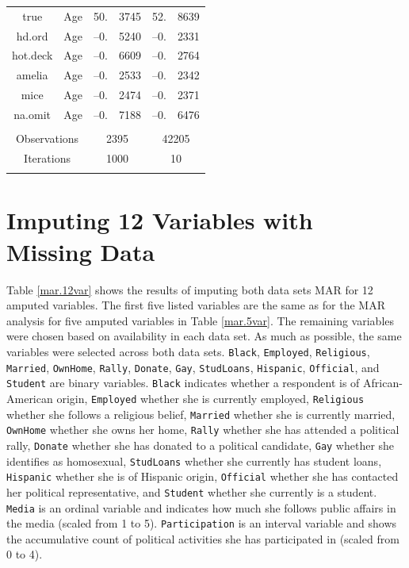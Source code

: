 \documentclass[12pt,econ]{sources/authesis}
\begin{document}
\begin{table}[!htbp]
\begin{tabular}{ccr@{}lr@{}l}
 true & Age & 50.&3745 & 52.&8639 \\ 
 hd.ord & Age & --0.&5240 & --0.&2331 \\
 hot.deck & Age & --0.&6609 & --0.&2764 \\
 amelia & Age & --0.&2533 & --0.&2342 \\
 mice & Age & --0.&2474 & --0.&2371 \\
 na.omit & Age & --0.&7188 & --0.&6476 \\
\hline \\[-1.8ex] 
\multicolumn{2}{c}{Observations} & \multicolumn{2}{c}{2395} & \multicolumn{2}{c}{42205} \\ 
\multicolumn{2}{c}{Iterations} & \multicolumn{2}{c}{1000} & \multicolumn{2}{c}{10} \\ 
\hline \\[-1.8ex] 
\end{tabular} 
\end{table}
\clearpage

\hypertarget{app-ordmiss-12var}{%
\section{Imputing 12 Variables with Missing Data}\label{app-ordmiss-12var}}

Table \ref{mar.12var} shows the results of imputing both data sets MAR for 12 amputed variables. The first five listed variables are the same as for the MAR analysis for five amputed variables in Table \ref{mar.5var}. The remaining variables were chosen based on availability in each data set. As much as possible, the same variables were selected across both data sets. \texttt{Black}, \texttt{Employed}, \texttt{Religious}, \texttt{Married}, \texttt{OwnHome}, \texttt{Rally}, \texttt{Donate}, \texttt{Gay}, \texttt{StudLoans}, \texttt{Hispanic}, \texttt{Official}, and \texttt{Student} are binary variables. \texttt{Black} indicates whether a respondent is of African-American origin, \texttt{Employed} whether she is currently employed, \texttt{Religious} whether she follows a religious belief, \texttt{Married} whether she is currently married, \texttt{OwnHome} whether she owns her home, \texttt{Rally} whether she has attended a political rally, \texttt{Donate} whether she has donated to a political candidate, \texttt{Gay} whether she identifies as homosexual, \texttt{StudLoans} whether she currently has student loans, \texttt{Hispanic} whether she is of Hispanic origin, \texttt{Official} whether she has contacted her political representative, and \texttt{Student} whether she currently is a student. \texttt{Media} is an ordinal variable and indicates how much she follows public affairs in the media (scaled from 1 to 5). \texttt{Participation} is an interval variable and shows the accumulative count of political activities she has participated in (scaled from 0 to 4).
\end{document}
